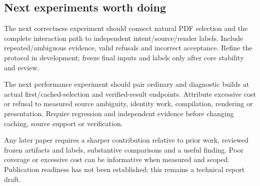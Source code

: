 \subsection{Next experiments worth doing}
The next correctness experiment should connect natural PDF selection and the
complete interaction path to independent intent/source/render labels. Include
repeated/ambiguous evidence, valid refusals and incorrect acceptance. Refine
the protocol in development; freeze final inputs and labels only after core
stability and review.

The next performance experiment should pair ordinary and diagnostic builds
at actual first/cached-selection and verified-result endpoints. Attribute
excessive cost or refusal to measured source ambiguity, identity work,
compilation, rendering or presentation. Require regression and independent
evidence before changing caching, source support or verification.

Any later paper requires a sharper contribution relative to prior work,
reviewed frozen artifacts and labels, substantive comparisons and a useful
finding. Poor coverage or excessive cost can be informative when measured
and scoped. Publication readiness has not been established; this remains a
technical report draft.
